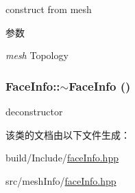 construct from mesh 
\begin{DoxyParams}{参数}
\item[{\em mesh}]Topology \end{DoxyParams}
\hypertarget{classFaceInfo_adc5fc3ff520ec912c4edc313015e22ca}{
\subsubsection[{$\sim$FaceInfo}]{\setlength{\rightskip}{0pt plus 5cm}FaceInfo::$\sim$FaceInfo ()}}
\label{classFaceInfo_adc5fc3ff520ec912c4edc313015e22ca}


deconstructor 

该类的文档由以下文件生成：\begin{DoxyCompactItemize}
\item 
build/Include/\hyperlink{build_2Include_2faceInfo_8hpp}{faceInfo.hpp}\item 
src/meshInfo/\hyperlink{src_2meshInfo_2faceInfo_8hpp}{faceInfo.hpp}\end{DoxyCompactItemize}
